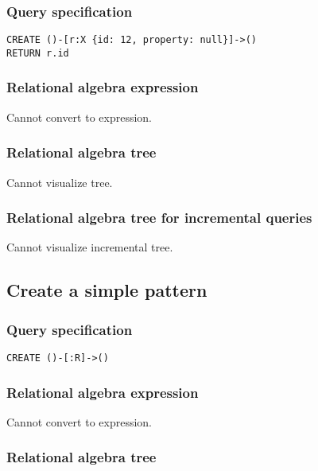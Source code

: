 \subsubsection*{Query specification}

\begin{lstlisting}
CREATE ()-[r:X {id: 12, property: null}]->()
RETURN r.id
\end{lstlisting}

\subsubsection*{Relational algebra expression}

Cannot convert to expression.

\subsubsection*{Relational algebra tree}

Cannot visualize tree.

\subsubsection*{Relational algebra tree for incremental queries}

Cannot visualize incremental tree.

\subsection{Create a simple pattern}

\subsubsection*{Query specification}

\begin{lstlisting}
CREATE ()-[:R]->()
\end{lstlisting}

\subsubsection*{Relational algebra expression}

Cannot convert to expression.

\subsubsection*{Relational algebra tree}

